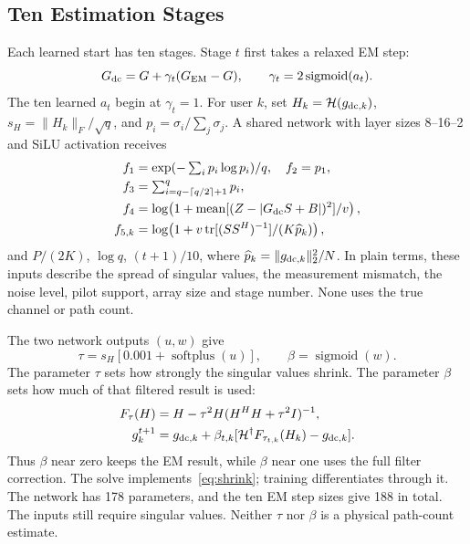 \documentclass[10pt,journal,letterpaper]{IEEEtran}
\newcommand{\HH}{\mathcal{H}}
\DeclareMathOperator{\tr}{tr}
\DeclareMathOperator{\sigmoid}{sigmoid}
\DeclareMathOperator{\softplus}{softplus}
\begin{document}
\subsection{Ten Estimation Stages}
Each learned start has ten stages. Stage $t$ first takes a relaxed EM step:
\begin{equation}
 G_{\rm dc}=G+\gamma_t(G_{\rm EM}-G),\qquad
 \gamma_t=2\sigmoid(a_t).
\end{equation}
The ten learned $a_t$ begin at $\gamma_t=1$. For user $k$, set $H_k=\HH(g_{{\rm dc},k})$, $s_H=\|H_k\|_F/\sqrt q$, and $p_i=\sigma_i/\sum_j\sigma_j$. A shared network with layer sizes 8--16--2 and SiLU activation receives
\begin{align}
 f_1&=\exp(-\textstyle\sum_i p_i\log p_i)/q,\quad f_2=p_1,\nonumber\\
 f_3&=\textstyle\sum_{i=q-\lceil q/2\rceil+1}^q p_i,\nonumber\\
 f_4&=\log\!\left(1+\operatorname{mean}[(Z-|G_{\rm dc}S+B|)^2]/v\right),\nonumber\\
 f_{5,k}&=\log\!\left(1+v\tr[(SS^H)^{-1}]/(K\widehat p_k)\right),
 \label{eq:features}
\end{align}
and $P/(2K)$, $\log q$, $(t+1)/10$, where $\widehat p_k=\|g_{{\rm dc},k}\|_2^2/N$. In plain terms, these inputs describe the spread of singular values, the measurement mismatch, the noise level, pilot support, array size and stage number. None uses the true channel or path count.

The two network outputs $(u,w)$ give
\begin{equation}
 \tau=s_H[0.001+\softplus(u)],\qquad\beta=\sigmoid(w).
\end{equation}
The parameter $\tau$ sets how strongly the singular values shrink. The parameter $\beta$ sets how much of that filtered result is used:
\begin{align}
 F_\tau(H)&=H-\tau^2H(H^HH+\tau^2I)^{-1},\label{eq:solve}\\
 g_k^{t+1}&=g_{{\rm dc},k}+\beta_{t,k}
 [\HH^\dagger F_{\tau_{t,k}}(H_k)-g_{{\rm dc},k}].
\end{align}
Thus $\beta$ near zero keeps the EM result, while $\beta$ near one uses the full filter correction. The solve implements~\eqref{eq:shrink}; training differentiates through it. The network has 178 parameters, and the ten EM step sizes give 188 in total. The inputs still require singular values. Neither $\tau$ nor $\beta$ is a physical path-count estimate.
\end{document}
